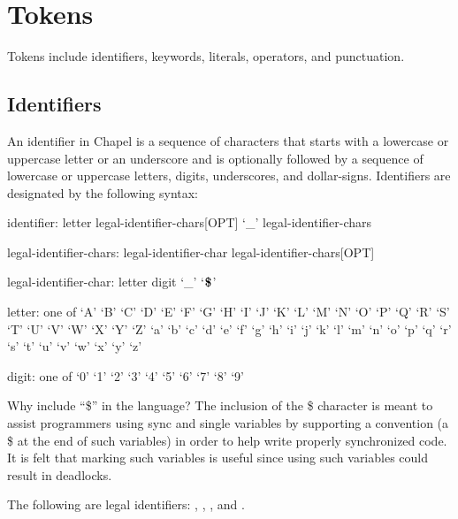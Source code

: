\section{Tokens}
\label{Tokens}

Tokens include identifiers, keywords, literals, operators, and
punctuation.

\subsection{Identifiers}
\label{Identifiers}

An identifier in Chapel is a sequence of characters that starts with a
lowercase or uppercase letter or an underscore and is optionally
followed by a sequence of lowercase or uppercase letters, digits,
underscores, and dollar-signs.  Identifiers are designated by the
following syntax:
\begin{syntax}
identifier:
  letter legal-identifier-chars[OPT]
  `_' legal-identifier-chars

legal-identifier-chars:
  legal-identifier-char legal-identifier-chars[OPT]

legal-identifier-char:
  letter
  digit
  `_'
  `$\mbox{{\bf \$}}$'

letter: one of
  `A' `B' `C' `D' `E' `F' `G' `H' `I' `J' `K' `L' `M' `N' `O' `P' `Q' `R' `S' `T' `U' `V' `W' `X' `Y' `Z' `a' `b' `c' `d' `e' `f' `g' `h' `i' `j' `k' `l' `m'
                           `n' `o' `p' `q' `r' `s' `t' `u' `v' `w' `x' `y' `z'

digit: one of
  `0' `1' `2' `3' `4' `5' `6' `7' `8' `9'
\end{syntax}

\begin{rationale}
Why include ``\$'' in the language?  The inclusion of the \$ character
is meant to assist programmers using sync and single variables by
supporting a convention (a \$ at the end of such variables) in order
to help write properly synchronized code.  It is felt that marking
such variables is useful since using such variables could result in
deadlocks.
\end{rationale}

\begin{example}
The following are legal
identifiers: , ,
, and .
\end{example}


